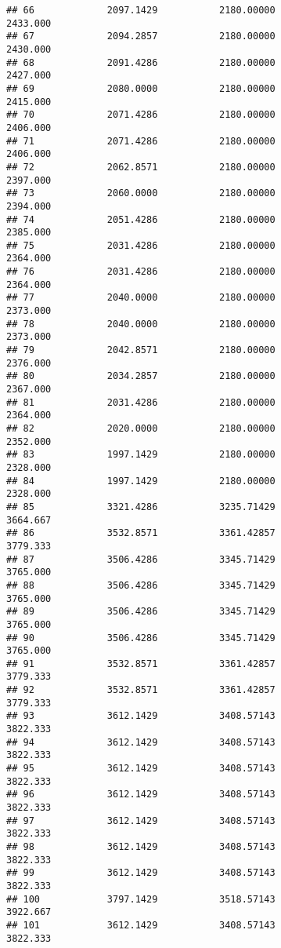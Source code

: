 \documentclass[]{article}
\begin{document}
\begin{verbatim}
## 66             2097.1429           2180.00000                2433.000
## 67             2094.2857           2180.00000                2430.000
## 68             2091.4286           2180.00000                2427.000
## 69             2080.0000           2180.00000                2415.000
## 70             2071.4286           2180.00000                2406.000
## 71             2071.4286           2180.00000                2406.000
## 72             2062.8571           2180.00000                2397.000
## 73             2060.0000           2180.00000                2394.000
## 74             2051.4286           2180.00000                2385.000
## 75             2031.4286           2180.00000                2364.000
## 76             2031.4286           2180.00000                2364.000
## 77             2040.0000           2180.00000                2373.000
## 78             2040.0000           2180.00000                2373.000
## 79             2042.8571           2180.00000                2376.000
## 80             2034.2857           2180.00000                2367.000
## 81             2031.4286           2180.00000                2364.000
## 82             2020.0000           2180.00000                2352.000
## 83             1997.1429           2180.00000                2328.000
## 84             1997.1429           2180.00000                2328.000
## 85             3321.4286           3235.71429                3664.667
## 86             3532.8571           3361.42857                3779.333
## 87             3506.4286           3345.71429                3765.000
## 88             3506.4286           3345.71429                3765.000
## 89             3506.4286           3345.71429                3765.000
## 90             3506.4286           3345.71429                3765.000
## 91             3532.8571           3361.42857                3779.333
## 92             3532.8571           3361.42857                3779.333
## 93             3612.1429           3408.57143                3822.333
## 94             3612.1429           3408.57143                3822.333
## 95             3612.1429           3408.57143                3822.333
## 96             3612.1429           3408.57143                3822.333
## 97             3612.1429           3408.57143                3822.333
## 98             3612.1429           3408.57143                3822.333
## 99             3612.1429           3408.57143                3822.333
## 100            3797.1429           3518.57143                3922.667
## 101            3612.1429           3408.57143                3822.333

\end{verbatim}
\end{document}
